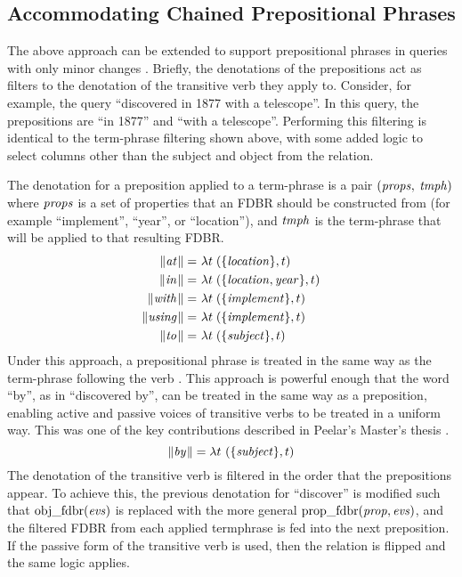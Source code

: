 \documentclass[../main.tex]{subfiles}
\begin{document}
\begin{refsection}
\subsection{Accommodating Chained Prepositional Phrases}

The above approach can be extended to support prepositional phrases in queries with only minor changes \cite{peelar2016accommodating, frost2013event}. Briefly, the denotations of the prepositions act as filters to the denotation of the transitive verb they apply to.  Consider, for example, the query ``discovered in 1877 with a telescope''.  In this query, the prepositions are ``in 1877'' and ``with a telescope''.  Performing this filtering is identical to the term-phrase filtering shown above, with some added logic to select columns other than the subject and object from the relation.

The denotation for a preposition applied to a term-phrase is a pair  $(\operatorname{\mathit{props}},$ $\operatorname{\mathit{tmph}})$ where $\operatorname{\mathit{props}}$ is a set of properties that an FDBR should be constructed from (for example ``implement'', ``year'', or ``location''), and $\operatorname{\mathit{tmph}}$ is the term-phrase that will be applied to that resulting FDBR.
\begin{equation*}
	\begin{split}
		\lVert\textit{at\hspace{0.1em}}\rVert =&\ \lambda t\;(\{\operatorname{\mathit{location}}\}, t) \\
		\lVert\textit{in\hspace{0.1em}}\rVert =&\ \lambda t\;(\{{\operatorname{\mathit{location}}}, {\operatorname{\mathit{year}}}\}, t) \\
		\lVert\textit{with\hspace{0.1em}}\rVert =&\ \lambda t\;(\{\operatorname{\mathit{implement}}\}, t) \\
		\lVert\textit{using\hspace{0.1em}}\rVert =&\ \lambda t\;(\{\operatorname{\mathit{implement}}\}, t) \\
		\lVert\textit{to\hspace{0.1em}}\rVert =&\ \lambda t\;(\{\operatorname{\mathit{subject}}\}, t)
	\end{split}
\end{equation*}
Under this approach, a prepositional phrase is treated in the same way as the term-phrase following the verb \cite{peelar2016accommodating}.
This approach is powerful enough that the word ``by'', as in ``discovered by'', can be treated in the same way as a preposition, enabling active and passive voices of transitive verbs to be treated in a uniform way.  This was one of the key contributions described in Peelar's Master's thesis \cite{peelar2016accommodating}.
\[
\meaningof{by} = \lambda t\ (\{\opit{subject}\}, t)
\]
The denotation of the transitive verb is filtered in the order that the prepositions appear.  To achieve this, the previous denotation for ``discover'' is modified such that $\operatorname{obj\_fdbr}({\operatorname{\mathit{evs}}})$ is replaced with the more general $\operatorname{prop\_fdbr}({\operatorname{\mathit{prop}}}, {\operatorname{\mathit{evs}}})$, and the filtered FDBR from each applied termphrase is fed into the next preposition.  If the passive form of the transitive verb is used, then the relation is flipped and the same logic applies.


\end{refsection}
\end{document}
